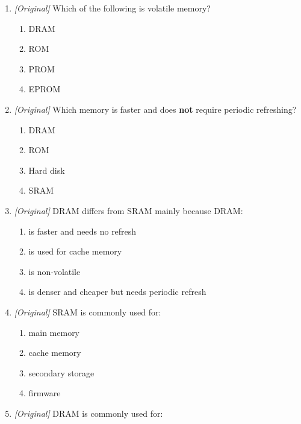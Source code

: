 \documentclass[11pt]{article}
\begin{document}
\begin{enumerate}[label=\textbf{Q\arabic*.}, leftmargin=*]
  holds the running programs and is cleared when the machine is switched off
  is:
  \begin{enumerate}[label=\Alph*.]
    \item ROM
    \item RAM
    \item L1 cache
    \item the SSD
  \end{enumerate}
\item \textit{[Original]} Which of the following is volatile memory?
  \begin{enumerate}[label=\Alph*.]
    \item DRAM
    \item ROM
    \item PROM
    \item EPROM
  \end{enumerate}
\item \textit{[Original]} Which memory is faster and does \textbf{not}
  require periodic refreshing?
  \begin{enumerate}[label=\Alph*.]
    \item DRAM
    \item ROM
    \item Hard disk
    \item SRAM
  \end{enumerate}
\item \textit{[Original]} DRAM differs from SRAM mainly because DRAM:
  \begin{enumerate}[label=\Alph*.]
    \item is faster and needs no refresh
    \item is used for cache memory
    \item is non-volatile
    \item is denser and cheaper but needs periodic refresh
  \end{enumerate}
\item \textit{[Original]} SRAM is commonly used for:
  \begin{enumerate}[label=\Alph*.]
    \item main memory
    \item cache memory
    \item secondary storage
    \item firmware
  \end{enumerate}
\item \textit{[Original]} DRAM is commonly used for:
  \begin{enumerate}[label=\Alph*.]

\end{enumerate}
\end{enumerate}
\end{document}
